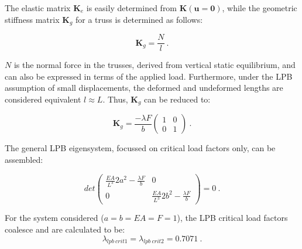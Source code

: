 The elastic matrix $\mathbf{K}_e$ is easily determined from $\mathbf{K}(\mathbf{u} = \mathbf{0})$, while the geometric stiffness matrix $\mathbf{K}_g$ for a truss is determined as follows:

 \begin{equation} 
\mathbf{K}_g = 
\frac{N}{l}
\label{eqapp0_12}\ .
\end{equation}

$N$ is the normal force in the trusses, derived from vertical static equilibrium, and can also be expressed in terms of the applied load. Furthermore, under the LPB assumption of small displacements, the deformed and undeformed lengths are considered equivalent $l \approx L$. Thus, $\mathbf{K}_g$ can be reduced to:

 \begin{equation} 
\mathbf{K}_g = 
\frac{-\lambda F}{b}
\begin{pmatrix}
1 & 0 \\
0 & 1
\end{pmatrix}
\label{eqapp0_13}\ .
\end{equation}

The general LPB eigensystem, focussed on critical load factors only, can be assembled:

 \begin{equation} 
 det
\begin{pmatrix}
\frac{EA}{L^3} 2a^2 - \frac{\lambda F}{b} & 0 \\
0 &  \frac{EA}{L^3} 2b^2 - \frac{\lambda F}{b}
\end{pmatrix}
= 0
\label{eqapp0_14}\ .
\end{equation}

For the system considered ($a=b=EA=F=1$), the LPB critical load factors coalesce and are calculated to be:
\begin{equation} 
\lambda_{lpb\ crit1} = 
\lambda_{lpb\ crit2} = 0.7071
\label{eqapp0_15}\ .
\end{equation}